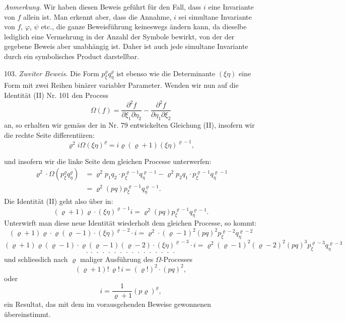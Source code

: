 \textit{Anmerkung.} Wir haben diesen Beweis geführt für den Fall, dass $i$ eine Invariante von $f$ allein ist. Man erkennt aber, dass die Annahme, $i$ sei simultane Invariante von $f$, $\varphi$, $\psi$ etc., die ganze Beweisführung keineswegs ändern kann, da dieselbe lediglich eine Vermehrung in der Anzahl der Symbole bewirkt, von der der gegebene Beweis aber unabhängig ist. Daher ist auch jede simultane Invariante durch ein symbolisches Product darstellbar.

103. \textit{Zweiter Beweis.} Die Form $p_\xi^\varrho q_\eta^\varrho$ ist ebenso wie die Determinante $(\xi\eta)$ eine Form mit zwei Reihen binärer variabler Parameter. Wenden wir nun auf die Identität (II) Nr. 101 den Process
\[
\Omega(f) = \frac{\partial^2 f}{\partial \xi_1 \partial \eta_2} - \frac{\partial^2 f}{\partial \eta_1 \partial \xi_2}
\]
an, so erhalten wir gemäss der in Nr. 79 entwickelten Gleichung (II), insofern wir die rechte Seite differentiiren:
\[
\varrho^2 i \Omega(\xi\eta)^\varrho = i \varrho (\varrho + 1) (\xi\eta)^{\varrho - 1},
\]


und insofern wir die linke Seite dem gleichen Processe unterwerfen:
\[
\begin{aligned}
\varrho^2 \cdot \Omega(p_\xi^\varrho q_\eta^\varrho) &= \varrho^2 p_1 q_2 \cdot p_\xi^{\varrho-1} q_\eta^{\varrho-1} - \varrho^2 p_2 q_1 \cdot p_\xi^{\varrho-1} q_\eta^{\varrho-1}\\
&= \varrho^2 (pq) p_\xi^{\varrho-1} q_\eta^{\varrho-1}.
\end{aligned}
\]
Die Identität (II) geht also über in:
\[
(\varrho + 1) \varrho \cdot (\xi\eta)^{\varrho-1} i = \varrho^2 (pq) p_\xi^{\varrho-1} q_\eta^{\varrho-1}.
\]
Unterwirft man diese neue Identität wiederholt dem gleichen Processe, so kommt:
\[
(\varrho + 1) \varrho \cdot \varrho (\varrho - 1) \cdot (\xi\eta)^{\varrho-2} \cdot i = \varrho^2 \cdot (\varrho - 1)^2 (pq)^2 p_\xi^{\varrho-2} q_\eta^{\varrho-2}
\]
\[
(\varrho + 1) \varrho (\varrho - 1) \cdot \varrho (\varrho - 1) (\varrho - 2) \cdot (\xi\eta)^{\varrho-3} \cdot i = \varrho^2 (\varrho - 1)^2 (\varrho - 2)^2 (pq)^3 p_\xi^{\varrho-3} q_\eta^{\varrho-3}
\]
\[
\cdot\ \cdot\ \cdot\ \cdot\ \cdot\ \cdot\ \cdot\ \cdot\ \cdot\ \cdot\ \cdot\ \cdot\ \cdot\ \cdot\ \cdot\ \cdot
\]
und schliesslich nach $\varrho$ maliger Ausführung des $\Omega$-Processes
\[
(\varrho + 1)!\, \varrho!\, i = (\varrho!)^2 \cdot (pq)^2,
\]
oder
\[
i = \frac{1}{\varrho + 1} (p\varrho)^\varrho, %
\]
ein Resultat, das mit dem im vorausgehenden Beweise gewonnenen übereinstimmt.

